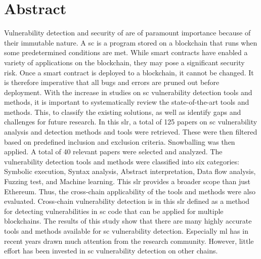 \chapter*{Abstract}

Vulnerability detection and security of  are of paramount importance because of their immutable nature. A \acrlong{sc} is a program stored on a blockchain that runs when some predetermined conditions are met. While smart contracts have enabled a variety of applications on the blockchain, they may pose a significant security risk. Once a smart contract is deployed to a blockchain, it cannot be changed. It is therefore imperative that all bugs and errors are pruned out before deployment. With the increase in studies on \acrlong{sc} vulnerability detection tools and methods, it is important to systematically review the state-of-the-art tools and methods. This, to classify the existing solutions, as well as identify gaps and challenges for future research. In this \acrfull{slr}, a total of 125 papers on \acrlong{sc} vulnerability analysis and detection methods and tools were retrieved. These were then filtered based on predefined inclusion and exclusion criteria. Snowballing was then applied. A total of 40 relevant papers were selected and analyzed. The vulnerability detection tools and methods were classified into six categories: Symbolic execution, Syntax analysis, Abstract interpretation, Data flow analysis, Fuzzing test, and Machine learning. This \acrshort{slr} provides a broader scope than just Ethereum. Thus, the cross-chain applicability of the tools and methods were also evaluated. Cross-chain vulnerability detection is in this \acrshort{slr} defined as a method for detecting vulnerabilities in \acrlong{sc} code that can be applied for multiple blockchains. The results of this study show that there are many highly accurate tools and methods available for \acrfull{sc} vulnerability detection. Especially \acrlong{ml} has in recent years drawn much attention from the research community. However, little effort has been invested in \acrlong{sc} vulnerability detection on other chains.
